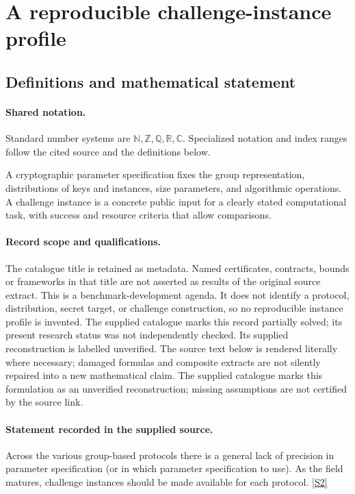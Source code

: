 \documentclass[11pt]{article}
\newcommand{\sref}[2]{\hyperlink{source:#1:#2}{[S#2]}}
\begin{document}
\section{A reproducible challenge-instance profile}\label{statement}

\subsection{Definitions and mathematical statement}

\paragraph{Shared notation.}Standard number systems are $\mathbb N,\mathbb Z,\mathbb Q,\mathbb R,\mathbb C$. Specialized notation and index ranges follow the cited source and the definitions below.


A cryptographic parameter specification fixes the group representation, distributions of keys and instances, size parameters, and algorithmic operations. A challenge instance is a concrete public input for a clearly stated computational task, with success and resource criteria that allow comparisons.
\paragraph{Record scope and qualifications.}
The catalogue title is retained as metadata. Named certificates, contracts, bounds or frameworks in that title are not asserted as results of the original source extract.
This is a benchmark-development agenda. It does not identify a protocol, distribution, secret target, or challenge construction, so no reproducible instance profile is invented. The supplied catalogue marks this record partially solved; its present research status was not independently checked. Its supplied reconstruction is labelled unverified.
The source text below is rendered literally where necessary; damaged formulas and composite extracts are not silently repaired into a new mathematical claim.
The supplied catalogue marks this formulation as an unverified reconstruction; missing assumptions are not certified by the source link.
\paragraph{Statement recorded in the supplied source.}
Across the various group-based protocols there is a general lack of precision in parameter specification (or in which parameter specification to use). As the field matures, challenge instances should be made available for each protocol. \sref{statement}{2}
\end{document}
